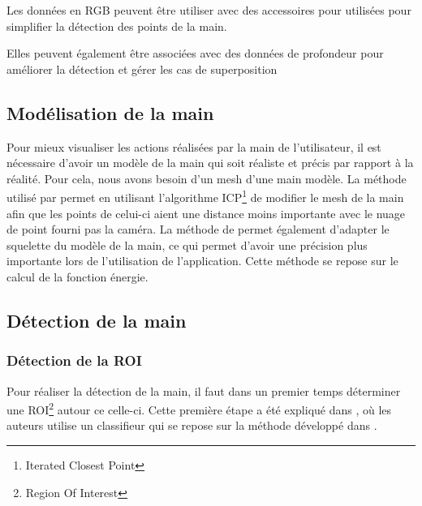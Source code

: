 \documentclass{article}
\begin{document}
Les données en RGB peuvent être utiliser avec des accessoires pour utilisées pour simplifier la détection des points de la main. \cite{wang2009real} 

Elles peuvent également être associées avec des données de profondeur pour améliorer la détection et gérer les cas de superposition \cite{van2011combining}

\subsection{Modélisation de la main}
Pour mieux visualiser les actions réalisées par la main de l'utilisateur, il est nécessaire d'avoir
un modèle de la main qui soit réaliste et précis par rapport à la réalité. Pour cela, nous avons besoin d'un
mesh d'une main modèle. La méthode utilisé par \cite{export:217428} permet en utilisant l'algorithme
ICP\footnote{Iterated Closest Point} \cite{zhang:inria-00074899} de modifier le mesh de la main afin
que les points de celui-ci aient une distance moins importante avec le nuage de point fourni pas la 
caméra. La méthode de \cite{export:217428} permet également d'adapter le squelette du modèle de la 
main, ce qui permet d'avoir une précision plus importante lors de l'utilisation de l'application.
Cette méthode se repose sur le calcul de la fonction énergie.


\subsection{Détection de la main}
\subsubsection{Détection de la ROI}
Pour réaliser la détection de la main, il faut dans un premier temps déterminer une ROI\footnote{Region Of Interest}
autour ce celle-ci. Cette première étape a été expliqué dans \cite{export:238453}, où les auteurs utilise un classifieur
qui se repose sur la méthode développé dans \cite{export:145347}.

\end{document}
